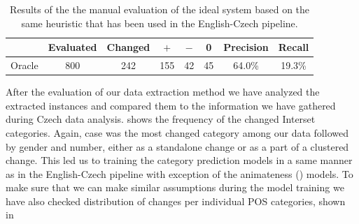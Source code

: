 \begin{table}[t]
\centering
\small

\begin{tabular}{l|cc|ccc|cc}
  &  Evaluated  &  Changed  &  $+$  &  $-$  &  0  &  Precision  &  Recall  \\
\hline
Oracle  &  800  &  242  &  155  &  42  &  45  &  64.0\%  &  19.3\%  \\
\end{tabular}
\caption{
Results of the the manual evaluation of the ideal system based on the same heuristic
that has been used in the English-Czech pipeline.
}
\label{oracle_de-maneval}
\end{table}

After the evaluation of our data extraction method we have analyzed the extracted instances and compared them
to the information we have gathered during Czech data analysis.  shows the frequency of the changed Interset
categories. Again, case was the most changed category among our data followed by gender and number, either as a standalone change or
as a part of a clustered change. This led us to training the category prediction models in a same manner as in the English-Czech
pipeline with exception of the animateness () models. To make sure that we can make similar assumptions during
the model training we have also checked distribution of changes per individual POS categories, shown in~

